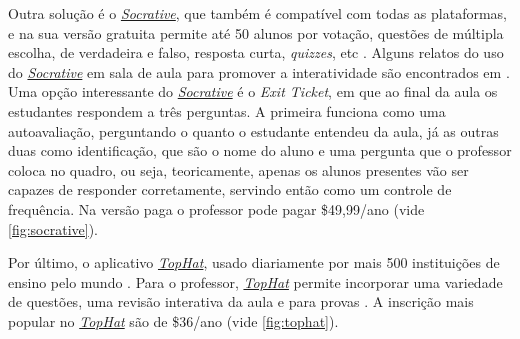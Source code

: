 Outra solução é o \href{http://www.socrative.com/}{\textit{Socrative}},
que também é compatível com todas as plataformas, e na sua versão gratuita
permite até 50 alunos por votação, questões de múltipla escolha, de verdadeira e falso,
resposta curta, \textit{quizzes}, etc \cite{socrative2016}. Alguns relatos do uso do
\href{http://www.socrative.com/}{\textit{Socrative}} em sala de aula para promover
a interatividade são encontrados em \cite{Kaya2016, Trindade2014}.
Uma opção interessante do \href{http://www.socrative.com/}{\textit{Socrative}}
é o \textit{Exit Ticket}, em que ao final da aula os estudantes respondem
a três perguntas. A primeira funciona como uma autoavaliação, perguntando
o quanto o estudante entendeu da aula, já as outras duas como identificação, que são o
nome do aluno e uma pergunta que o professor coloca no quadro, ou seja, teoricamente,
apenas os alunos presentes vão ser capazes de responder corretamente, servindo
então como um controle de frequência. Na versão paga o professor pode pagar \$49,99/ano (vide \autoref{fig:socrative}).

Por último, o aplicativo \href{http://www.tophat.com/}{\textit{TopHat}}, usado diariamente por
mais 500 instituições de ensino pelo mundo \cite{tophat2016}.
Para o professor, \href{http://www.tophat.com/}{\textit{TopHat}} permite incorporar
uma variedade de questões, uma revisão interativa da aula e para provas
\cite{Neilson2016, Lantz2014}. A inscrição mais popular no  \href{http://www.tophat.com/}{\textit{TopHat}}
são de \$36/ano (vide \autoref{fig:tophat}).

